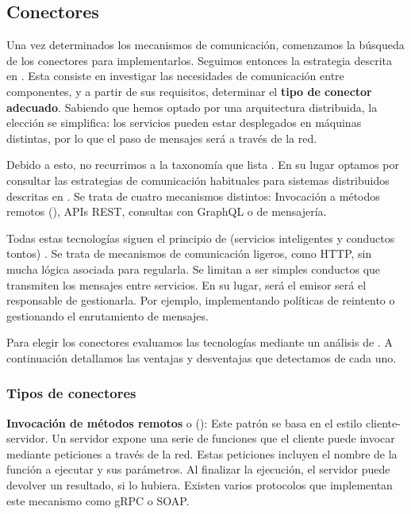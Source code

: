 \subsection{Conectores}

Una vez determinados los mecanismos de comunicación, comenzamos la búsqueda de los conectores para implementarlos. Seguimos entonces la estrategia descrita en \cite{taylorSoftwareArchitectureFoundations2009}. Esta consiste en investigar las necesidades de comunicación entre componentes, y a partir de sus requisitos, determinar el \textbf{tipo de conector adecuado}. Sabiendo que hemos optado por una arquitectura distribuida, la elección se simplifica: los servicios pueden estar desplegados en máquinas distintas, por lo que el paso de mensajes será a través de la red.

Debido a esto, no recurrimos a la taxonomía que lista \cite{mehtaTaxonomySoftwareConnectors2000}. En su lugar optamos por consultar las estrategias de comunicación habituales para sistemas distribuidos descritas en \cite{newmanBuildingMicroservicesDesigning2021}. Se trata de cuatro mecanismos distintos: Invocación a métodos remotos (), APIs REST, consultas con GraphQL o  de mensajería.

Todas estas tecnologías siguen el principio de \textbf{} (servicios inteligentes y conductos tontos) \cite{lewisMicroservices14}. Se trata de mecanismos de comunicación ligeros, como HTTP, sin mucha lógica asociada para regularla. Se limitan a ser simples conductos que transmiten los mensajes entre servicios. En su lugar, será el emisor será el responsable de gestionarla. Por ejemplo, implementando políticas de reintento o gestionando el enrutamiento de mensajes.

Para elegir los conectores evaluamos las tecnologías mediante un análisis de . A continuación detallamos las ventajas y desventajas que detectamos de cada uno.

\subsubsection{Tipos de conectores}

\textbf{Invocación de métodos remotos} o (): Este patrón se basa en el estilo cliente-servidor. Un servidor expone una serie de funciones que el cliente puede invocar mediante peticiones a través de la red. \cite{newmanBuildingMicroservicesDesigning2021} Estas peticiones incluyen el nombre de la función a ejecutar y sus parámetros. Al finalizar la ejecución, el servidor puede devolver un resultado, si lo hubiera. Existen varios protocolos que implementan este mecanismo como gRPC o SOAP.

